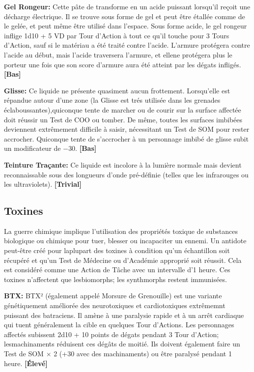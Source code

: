 \textbf{Gel Rongeur:} Cette pâte de transforme en un acide puissant lorsqu'il reçoit une décharge électrique. Il se trouve sous forme de gel et peut être étallée comme de le gelée, et peut même être utilisé dans l'espace. Sous forme acide, le gel rongeur inflige 1d10 + 5 VD par Tour d'Action à tout ce qu'il touche pour 3 Tours d'Action, sauf si le matériau a été traité contre l'acide. L'armure protégera contre l'acide au début, mais l'acide traversera l'armure, et ellene protégera plus le porteur une fois que son score d'armure aura été atteint par les dégats infligés. \textbf{[Bas]} 

\textbf{Glisse:} Ce liquide ne présente quasiment aucun frottement. Lorsqu'elle est répandue autour d'une zone (la Glisse est trés utilisée dans les grenades éclaboussantes),quiconque tente de marcher ou de courir sur la surface affectée doit réussir un Test de COO ou tomber. De même, toutes les surfaces imbibées deviennent extrêmement difficile à saisir, nécessitant un Test de SOM pour rester accrocher. Quiconque tente de s'accrocher à un personnage imbibé de glisse subit un modificateur de $-$30. \textbf{[Bas]} 

\textbf{Teinture Traçante:} Ce liquide est incolore à la lumière normale mais devient reconnaissable sous des longueurs d'onde pré-définie (telles que les infrarouges ou les ultraviolets). \textbf{[Trivial]} 

\subsection{Toxines} \label{sec:toxins} 

La guerre chimique implique l'utilisation des propriétés toxique de substances biologique ou chimique pour tuer, blesser ou incapaciter un ennemi. Un antidote peut-être créé pour laplupart des toxines à condition qu'un échantillon soit récupéré et qu'un Test de Médecine ou d'Académie approprié soit réussit. Cela est considéré comme une Action de Tâche avec un intervalle d'1 heure. Ces toxines n'affectent que lesbiomorphs; les synthmorphs restent immunisées. 

\textbf{BTX:} BTX² (également appelé Morsure de Grenouille) est une variante génétiquement améliorée des neurotoxiques et cardiotoxiques extrêmemnt puissant des batraciens. Il amène à une paralysie rapide et à un arrêt cardiaque qui tuent généralement la cible en quelques Tour d'Actions. Les personnages affectés subissent 2d10 + 10 points de dégats pendant 3 Tour d'Action; lesmachinaments réduisent ces dégâts de moitié. Ils doivent également faire un Test de SOM $\times$ 2 (+30 avec des machinaments) ou être paralysé pendant 1 heure. \textbf{[Élevé]} 

